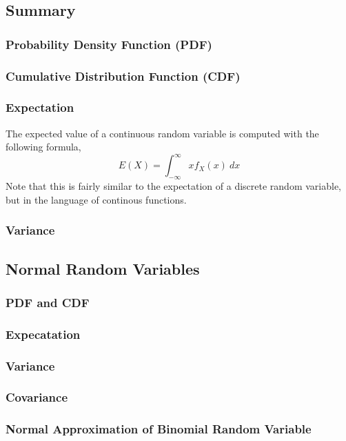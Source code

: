 \documentclass{amsart}
\begin{document}
			\subsection{Summary}
				\subsubsection{Probability Density Function (PDF)}
				
				\subsubsection{Cumulative Distribution Function (CDF)}
			
				\subsubsection{Expectation} 
				The expected value of a continuous random variable is computed with the following formula,
					$$
						E(X) = \int_{-\infty}^{\infty} x f_{X}(x) \ dx
					$$
				Note that this is fairly similar to the expectation of a discrete random variable, but in the language of continous functions.			
					
				\subsubsection{Variance}
			\subsection{Normal Random Variables}
				\subsubsection{PDF and CDF}
					
				\subsubsection{Expecatation}
					
				\subsubsection{Variance}
				
				\subsubsection{Covariance}
				
				\subsubsection{Normal Approximation of Binomial Random Variable}
				
\end{document}
